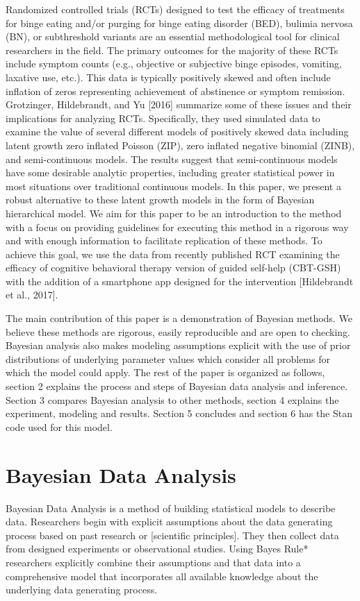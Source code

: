 \documentclass{article}
\begin{document}
Randomized controlled trials (RCTs) designed to test the efficacy of treatments for binge eating and/or purging for binge eating disorder (BED), bulimia nervosa (BN), or subthreshold variants are an essential methodological tool for clinical researchers in the field.  The primary outcomes for the majority of these RCTs include symptom counts (e.g., objective or subjective binge episodes, vomiting, laxative use, etc.). This data is typically positively skewed and often include inflation of zeros representing achievement of abstinence or symptom remission.  Grotzinger, Hildebrandt, and Yu [2016] summarize some of these issues and their implications for analyzing RCTs.  Specifically, they used simulated data to examine the value of several different models of positively skewed data including latent growth zero inflated Poisson (ZIP), zero inflated negative binomial (ZINB), and semi-continuous models.  The results suggest that semi-continuous models have some desirable analytic properties, including greater statistical power in most situations over traditional continuous models.  In this paper, we present a robust alternative to these latent growth models in the form of Bayesian hierarchical model.  We aim for this paper to be an introduction to the method with a focus on providing guidelines for executing this method in a rigorous way and with enough information to facilitate replication of these methods.  To achieve this goal, we use the data from recently published RCT examining the efficacy of cognitive behavioral therapy version of guided self-help (CBT-GSH) with the addition of a smartphone app designed for the intervention [Hildebrandt et al., 2017]. 

The main contribution of this paper is a demonstration of Bayesian methods. We believe these methods are rigorous, easily reproducible and are open to checking. Bayesian analysis also makes modeling assumptions explicit with the use of prior distributions of underlying parameter values which consider all  problems for which the model could apply.  The rest of the paper is organized as follows, section 2 explains the process and steps of Bayesian data analysis and inference. Section 3 compares Bayesian analysis to other methods, section 4 explains the experiment, modeling and results. Section 5 concludes and section 6 has the Stan code used for this model.

\section{Bayesian Data Analysis}
Bayesian Data Analysis is a method of building statistical models to describe data.  Researchers begin with explicit assumptions about the data generating process based on past research or [scientific principles].  They then collect data from designed experiments or observational studies.  Using Bayes Rule* researchers explicitly combine their assumptions and that data into a comprehensive model that incorporates all available knowledge about the underlying data generating process.  
\end{document}
